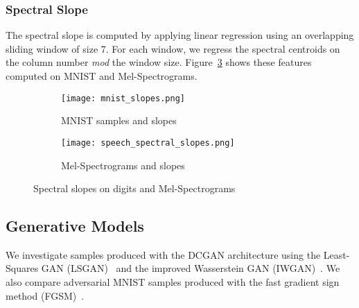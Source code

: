 \subsubsection{Spectral Slope}
The spectral slope is computed by applying linear regression using an overlapping
sliding window of size 7. For each window, we regress the spectral centroids on
the column number \textit{mod} the window size. Figure~\ref{fig:slopes} shows these
features computed on MNIST and Mel-Spectrograms. 

\begin{figure}[!h]
    \centering
    \begin{subfigure}[b]{0.4\textwidth}
        \texttt{[image: mnist\_slopes.png]}
        \caption{MNIST samples and slopes}
        \label{fig:mnist_slopes}
    \end{subfigure}
    \quad
    \begin{subfigure}[b]{0.4\textwidth}
        \texttt{[image: speech\_spectral\_slopes.png]}
        \caption{Mel-Spectrograms and slopes}
        \label{fig:spectrogram_slopes}
    \end{subfigure}
    \caption{Spectral slopes on digits and Mel-Spectrograms}
    \label{fig:slopes}
\end{figure}

\subsection{Generative Models}
We investigate samples produced with the DCGAN architecture using the
Least-Squares GAN (LSGAN)~\cite{mao2016least} and the improved Wasserstein
GAN (IWGAN)~\cite{gulrajani2017improved}. We also compare adversarial MNIST
samples produced with the fast gradient sign method
(FGSM)~\cite{goodfellow2014explaining}.

